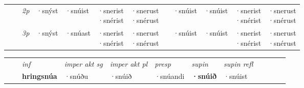 \begin{tabular}{llllllllllll}
 &&  {\textit{2p}} &  ·snýst  & ·snúist   & \specialcell{·snerist\\  ·snérist} & \specialcell{·snerust\\  ·snérust} & &·snúist & ·snúist & \specialcell{·snerist\\  ·snérist} & \specialcell{·snerust\\  ·snérust} \\*
& &  {\textit{3p}} & ·snýst & ·snúast   & \specialcell{·snerist\\  ·snérist} & \specialcell{·snerust\\  ·snérust} & & ·snúist & ·snúist& \specialcell{·snerist\\  ·snérist} & \specialcell{·snerust\\  ·snérust}  \\*
\cmidrule{4-7} \cmidrule{9-12}
\end{tabular}


\begin{tabular}{llllllllllll}
 & & \textit{inf} & \textit{imper akt sg} & \textit{imper akt pl}   & \textit{presp} & \textit{supin} & \textit{supin refl}      \\*
  & & \textbf{hringsnúa} & ·snúðu  & ·snúið   & ·snúandi &  \textbf{·snúið} & ·snúist  \\*
\cmidrule{1-12}
\end{tabular}




